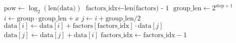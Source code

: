 \begin{algorithm}
    \begin{algorithmic}
            \State $\text{pow} \gets \log_2(\text{len(data)})$
            \State $\text{factors\_idx} \gets \text{len(factors) - 1}$
                \State $\text{group\_len} \gets 2^{\text{step} + 1}$
                        \State $i \gets \text{group} \cdot \text{group\_len} + x$
                        \State $j \gets i + \text{group\_len} / 2$
                        \State $\text{data}[i] \gets \text{data}[i] + \text{factors}[\text{factors\_idx}] \cdot \text{data}[j]$
                        \State $\text{data}[j] \gets \text{data}[j] + \text{data}[i]$
                    \EndFor
                \EndFor
                \State $\text{factors\_idx} \gets \text{factors\_idx} - 1$
            \EndFor
        \EndFunction
    \end{algorithmic}
\end{algorithm}

